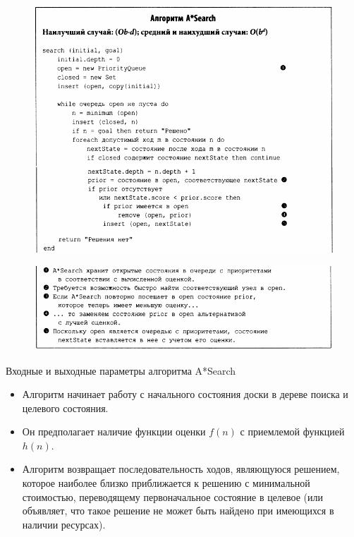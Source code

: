 \documentclass{beamer}
\begin{document}
\begin{frame}
\begin{figure}[h]
\centering
\includegraphics[scale=0.5]{images/lec06-pic08.png}
\end{figure}
\end{frame}

\begin{frame}
\begin{figure}[h]
\centering
\includegraphics[scale=0.6]{images/lec06-pic09.png}
\end{figure}
\end{frame}

\begin{frame}{Входные и выходные параметры алгоритма A*Search}
\begin{itemize}
\item Алгоритм начинает работу с начального состояния доски в дереве поиска и целевого состояния. 
\item Он предполагает наличие функции оценки $f(n)$ с приемлемой функцией $h(n)$.
\item Алгоритм возвращает последовательность ходов, являющуюся решением,
которое наиболее близко приближается к решению с минимальной стоимостью, переводящему первоначальное состояние в целевое (или объявляет, что такое решение не может быть найдено при имеющихся в наличии ресурсах).
\end{itemize}
\end{frame}
\end{document}
